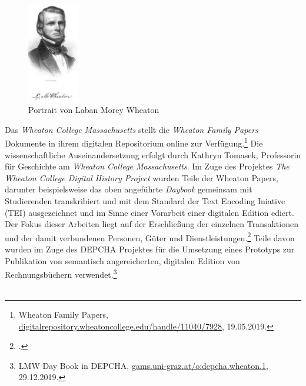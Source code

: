 \documentclass[12pt,a4paper]{article}
\begin{document}
\begin{figure}[H]
\centering
	\includegraphics[width=0.2\textwidth]{img/LMwheaton.jpg}  
    \caption[Portrait von Laban Morey Wheaton, CLARK, George Faber: A History of the Town of Norton, Bristol County, Massachusetts, from 1669-1859.
Crosby, Nichols, and Company, and author at Norton, 1859, S.497.]{Portrait von Laban Morey Wheaton} \label{fig:LMwheaton}
\end{figure} 
Das \textit{Wheaton College Massachusetts} stellt die \textit{Wheaton Family Papers} Dokumente in ihrem digitalen Repositorium online zur Verfügung.\footnote{Wheaton Family Papers, \url{digitalrepository.wheatoncollege.edu/handle/11040/7928}, 19.05.2019.} Die wissenschaftliche Auseinandersetzung erfolgt durch Kathryn Tomasek, Professorin für Geschichte am \textit{Wheaton College Massachusetts}. Im Zuge des Projektes \textit{The Wheaton College Digital History Project} wurden Teile der Wheaton Papers, darunter beispielsweise das oben angeführte \textit{Daybook} gemeinsam mit Studierenden transkribiert und mit dem Standard der Text Encoding Iniative (TEI) ausgezeichnet und im Sinne einer Vorarbeit einer digitalen Edition ediert. Der Fokus dieser Arbeiten liegt auf der Erschließung der einzelnen Transaktionen und der damit verbundenen Personen, Güter und Dienstleistungen.\footcite[TOMASEK Kathryn: The Wheaton College Digital History Project: Undergraduate Research in a Local Collection, \protect\url{writinghistory.trincoll.edu/teach/wheaton-college-digital-history-project-tomasek}, 23.05.2019.][S.379]{alexander2012should} Teile davon wurden im Zuge des DEPCHA Projektes für die Umsetzung eines Prototyps zur Publikation von semantisch angereicherten, digitalen Edition von Rechnungsbüchern verwendet.\footnote{LMW Day Book in DEPCHA, \url{gams.uni-graz.at/o:depcha.wheaton.1}, 29.12.2019.}
\\
\\
\end{document}
